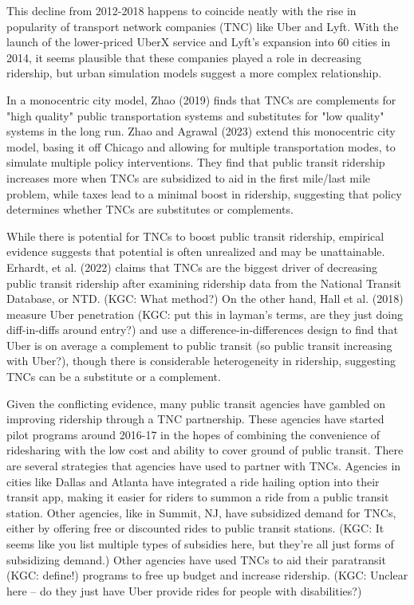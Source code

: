 \documentclass [11pt]{article}
\begin{document}


\indent This decline from 2012-2018 happens to coincide neatly with the rise in popularity of transport network companies (TNC) like Uber and Lyft. With the launch of the lower-priced UberX service and Lyft's expansion into 60 cities in 2014, it seems plausible that these companies played a role in decreasing ridership, but urban simulation models suggest a more complex relationship. 

In a monocentric city model, Zhao (2019) finds that TNCs are complements for "high quality" public transportation systems and substitutes for "low quality" systems in the long run. Zhao and Agrawal (2023) extend this monocentric city model, basing it off Chicago and allowing for multiple transportation modes, to simulate multiple policy interventions. They find that public transit ridership increases more when TNCs are subsidized to aid in the first mile/last mile problem, while taxes lead to a minimal boost in ridership, suggesting that policy determines whether TNCs are substitutes or complements. 

While there is potential for TNCs to boost public transit ridership, empirical evidence suggests that potential is often unrealized and may be unattainable. Erhardt, et al. (2022) claims that TNCs are the biggest driver of decreasing public transit ridership after examining ridership data from the National Transit Database, or NTD. (KGC: What method?) On the other hand, Hall et al. (2018) measure Uber penetration (KGC: put this in layman's terms, are they just doing diff-in-diffs around entry?) and use a difference-in-differences design to find that Uber is on average a complement to public transit (so public transit increasing with Uber?), though there is considerable heterogeneity in ridership, suggesting TNCs can be a substitute or a complement. 

\indent Given the conflicting evidence, many public transit agencies have gambled on improving ridership through a TNC partnership. These agencies have started pilot programs around 2016-17 in the hopes of combining the convenience of ridesharing with the low cost and ability to cover ground of public transit. There are several strategies that agencies have used to partner with TNCs. Agencies in cities like Dallas and Atlanta have integrated a ride hailing option into their transit app, making it easier for riders to summon a ride from a public transit station. Other agencies, like in Summit, NJ, have subsidized demand for TNCs, either by offering free or discounted rides to public transit stations. (KGC: It seems like you list multiple types of subsidies here, but they're all just forms of subsidizing demand.) Other agencies have used TNCs to aid their paratransit (KGC: define!) programs to free up budget and increase ridership. (KGC: Unclear here -- do they just have Uber provide rides for people with disabilities?)\\
\end{document}

